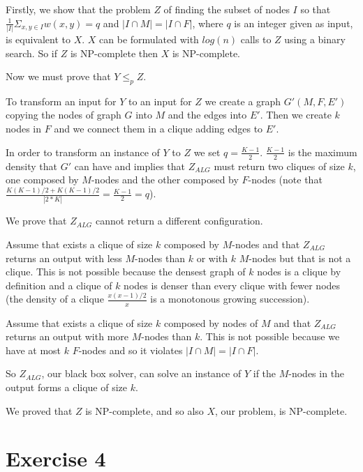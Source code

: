 \documentclass[paper=a4, fontsize=11pt]{scrartcl} %
\numberwithin{equation}{section} %
\numberwithin{figure}{section} %
\numberwithin{table}{section} %
\begin{document}
Firstly, we show that the problem $Z$ of finding the subset of nodes $I$ so that $\frac{1}{|I|} \Sigma_{x,y \in I} w(x, y) = q$ and $|I \cap M| = |I \cap F|$, where $q$ is an integer given as input, is equivalent to $X$.
$X$ can be formulated with $log(n)$ calls to $Z$ using a binary search. So if $Z$ is NP-complete then $X$ is NP-complete.

Now we must prove that $Y \leq_p Z$.

To transform an input for $Y$ to an input for $Z$ we create a graph $G'(M, F, E')$ copying the nodes of graph $G$ into $M$ and the edges into $E'$. Then we create $k$ nodes in $F$ and we connect them in a clique adding edges to $E'$.

In order to transform an instance of $Y$ to $Z$ we set $q = \frac{K-1}{2}$. 
$\frac{K-1}{2}$ is the maximum density that $G'$ can have and implies that $Z_{ALG}$ must return two cliques of size $k$, one composed by $M$-nodes and the other composed by $F$-nodes \Big(note that $\frac{ K(K-1)/2 + K(K-1)/2 }{|2*K|} = \frac{K-1}{2} = q$\Big).

We prove that $Z_{ALG}$ cannot return a different configuration.

Assume that exists a clique of size $k$ composed by $M$-nodes and that $Z_{ALG}$ returns an output with less $M$-nodes than $k$ or with $k$ $M$-nodes but that is not a clique.
This is not possible because the densest graph of $k$ nodes is a clique by definition and a clique of $k$ nodes is denser than every clique with fewer nodes (the density of a clique $\frac{x(x-1)/2}{x}$ is a monotonous growing succession). %

Assume that exists a clique of size $k$ composed by nodes of $M$ and that $Z_{ALG}$ returns an output with more $M$-nodes than $k$.
This is not possible because we have at most $k$ $F$-nodes and so it violates $|I \cap M| = |I \cap F|$.

So $Z_{ALG}$, our black box solver, can solve an instance of $Y$ if the $M$-nodes in the output forms a clique of size $k$.

We proved that $Z$ is NP-complete, and so also $X$, our problem, is NP-complete.



\newpage
\section*{Exercise 4}
\end{document}
